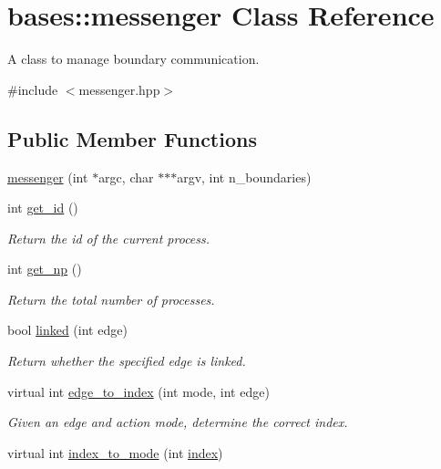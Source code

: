 \hypertarget{classbases_1_1messenger}{\section{bases\-:\-:messenger Class Reference}
\label{classbases_1_1messenger}
}


A class to manage boundary communication.  




{\ttfamily \#include $<$messenger.\-hpp$>$}

\subsection*{Public Member Functions}
\begin{DoxyCompactItemize}
\item 
\hyperlink{classbases_1_1messenger_ae4aade26c6ef7809a30659471a6d0ad2}{messenger} (int $\ast$argc, char $\ast$$\ast$$\ast$argv, int n\-\_\-boundaries)
\item 
int \hyperlink{classbases_1_1messenger_a6aa3309dfbebace3cec88f57cf9edfce}{get\-\_\-id} ()
\begin{DoxyCompactList}\small\item\em Return the id of the current process. \end{DoxyCompactList}\item 
int \hyperlink{classbases_1_1messenger_ad5eda2bab3d38ae383579108a03f2c5b}{get\-\_\-np} ()
\begin{DoxyCompactList}\small\item\em Return the total number of processes. \end{DoxyCompactList}\item 
bool \hyperlink{classbases_1_1messenger_ae7e221a16bc75c302fe3d48a63359be7}{linked} (int edge)
\begin{DoxyCompactList}\small\item\em Return whether the specified edge is linked. \end{DoxyCompactList}\item 
virtual int \hyperlink{classbases_1_1messenger_a7d9b96f1b04598c480d367a95015cc72}{edge\-\_\-to\-\_\-index} (int mode, int edge)
\begin{DoxyCompactList}\small\item\em Given an edge and action mode, determine the correct index. \end{DoxyCompactList}\item 
virtual int \hyperlink{classbases_1_1messenger_a419d764733431f850130f1024fbe75fc}{index\-\_\-to\-\_\-mode} (int \hyperlink{plan_8hpp_a6784e1c334dfceb8f017667c0b0f6a3e}{index})

\end{DoxyCompactItemize}
